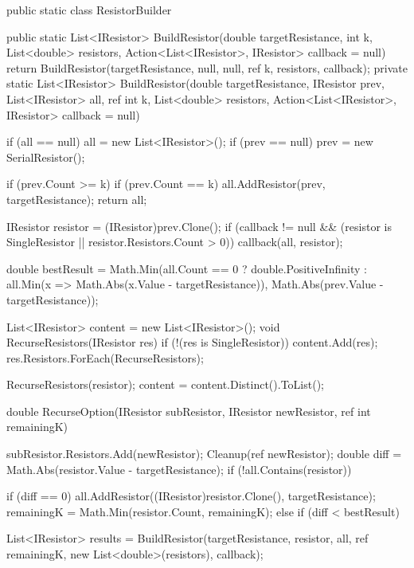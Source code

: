 \documentclass{article}
\begin{document}
\begin{Csharp}[caption=Klasse ResistorBuilder,label=LIS:Buildr] 
public static class ResistorBuilder
{
    public static List<IResistor> BuildResistor(double targetResistance, int k, List<double> resistors, Action<List<IResistor>, IResistor> callback = null)
    {
        return BuildResistor(targetResistance, null, null, ref k, resistors, callback);
    }
    private static List<IResistor> BuildResistor(double targetResistance, IResistor prev, List<IResistor> all, ref int k, List<double> resistors, Action<List<IResistor>, IResistor> callback = null)
    {
        if (all == null) all = new List<IResistor>();
        if (prev == null) prev = new SerialResistor();

        if (prev.Count >= k)
        {
            if (prev.Count == k) all.AddResistor(prev, targetResistance);
            return all;
        }

        IResistor resistor = (IResistor)prev.Clone();
        if (callback != null && (resistor is SingleResistor || resistor.Resistors.Count > 0)) callback(all, resistor);

        double bestResult = Math.Min(all.Count == 0 ? double.PositiveInfinity 
                                                    : all.Min(x => Math.Abs(x.Value - targetResistance)), Math.Abs(prev.Value - targetResistance));

        List<IResistor> content = new List<IResistor>();
        void RecurseResistors(IResistor res)
        {
            if (!(res is SingleResistor))
            {
                content.Add(res);
                res.Resistors.ForEach(RecurseResistors);
            }
        }

        RecurseResistors(resistor);
        content = content.Distinct().ToList();

        double RecurseOption(IResistor subResistor, IResistor newResistor, ref int remainingK)
        {
            subResistor.Resistors.Add(newResistor);
            Cleanup(ref newResistor);
            double diff = Math.Abs(resistor.Value - targetResistance);
            if (!all.Contains(resistor))
            {
                if (diff == 0)
                {
                    all.AddResistor((IResistor)resistor.Clone(), targetResistance);
                    remainingK = Math.Min(resistor.Count, remainingK);
                }
                else if (diff < bestResult)
                {
                    List<IResistor> results = BuildResistor(targetResistance, resistor, all, ref remainingK, new List<double>(resistors), callback);

}}}}}
\end{Csharp}
\end{document}
